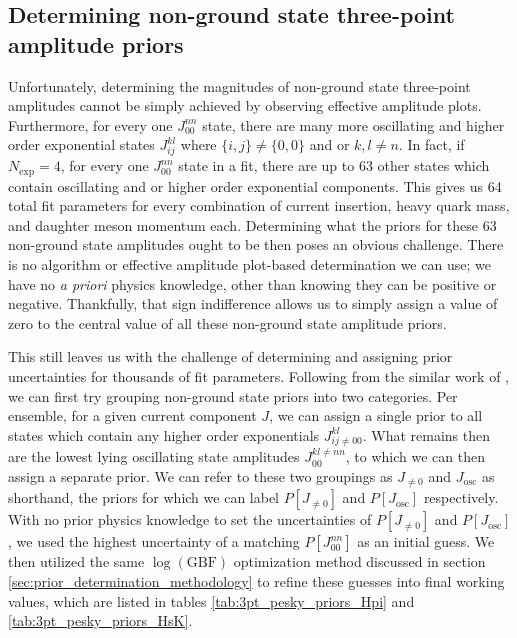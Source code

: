 \subsection{Determining non-ground state three-point amplitude priors}
Unfortunately, determining the magnitudes of non-ground state three-point amplitudes cannot be simply achieved by observing effective amplitude plots.  Furthermore, for every one $J_{00}^{nn}$ state, there are many more oscillating and higher order exponential states $J_{ij}^{kl}$ where $\{i,j\}\neq \{0,0\}$ and or $k,l \neq n$.  In fact, if $N_\text{exp} = 4$, for every one $J_{00}^{nn}$ state in a fit, there are up to 63 other states which contain oscillating and or higher order exponential components.  This gives us 64 total fit parameters for every combination of current insertion, heavy quark mass, and daughter meson momentum each. Determining what the priors for these 63 non-ground state amplitudes ought to be then poses an obvious challenge.  There is no algorithm or effective amplitude plot-based determination we can use;  we have no \textit{a priori} physics knowledge, other than knowing they can be positive or negative.  Thankfully, that sign indifference allows us to simply assign a value of zero to the central value of all these non-ground state amplitude priors.  

This still leaves us with the challenge of determining and assigning prior uncertainties for thousands of fit parameters.  Following from the similar work of \cite{Will_technical}, we can first try grouping non-ground state priors into two categories.  Per ensemble, for a given current component $J$, we can assign a single prior to all states which contain any higher order exponentials $J_{ij\neq00}^{kl}$.  What remains then are the lowest lying oscillating state amplitudes $J_{00}^{kl\neq nn}$, to which we can then assign a separate prior.  We can refer to these two groupings as $J_{\neq0}$ and $J_\mathrm{osc}$ as shorthand, the priors for which we can label $P[J_{\neq0}]$ and $P[J_\mathrm{osc}]$ respectively.  With no prior physics knowledge to set the uncertainties of $P[J_{\neq0}]$ and $P[J_\mathrm{osc}]$, we used the highest uncertainty of a matching $P[J_{00}^{nn}]$ as an initial guess.  We then utilized the same $\log (\mathrm{GBF})$ optimization method discussed in section \ref{sec:prior_determination_methodology} to refine these guesses into final working values, which are listed in tables \ref{tab:3pt_pesky_priors_Hpi} and \ref{tab:3pt_pesky_priors_HsK}.



